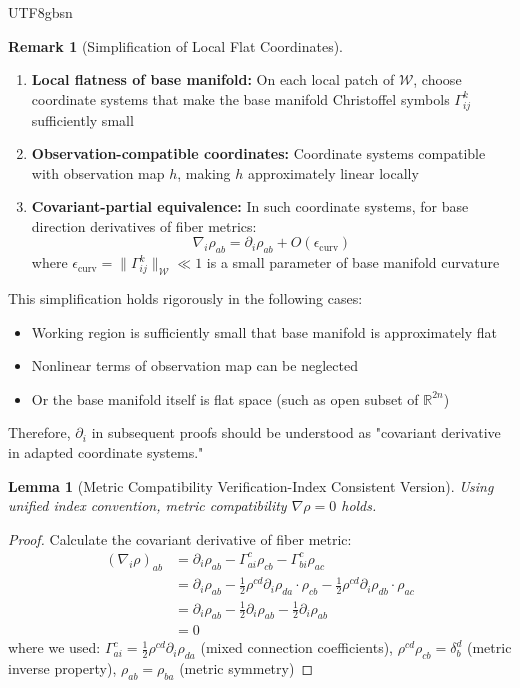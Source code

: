 \documentclass[a4paper,12pt]{extarticle}
\newtheorem{lemma}[theorem]{Lemma}
\theoremstyle{definition}
\newtheorem{remark}{Remark}
\begin{document}
\begin{CJK}{UTF8}{gbsn}
\begin{remark}[Simplification of Local Flat Coordinates]
\begin{enumerate}
\item \textbf{Local flatness of base manifold:} On each local patch of $\mathcal{W}$, choose coordinate systems that make the base manifold Christoffel symbols $\Gamma^k_{ij}$ sufficiently small
\item \textbf{Observation-compatible coordinates:} Coordinate systems compatible with observation map $h$, making $h$ approximately linear locally
\item \textbf{Covariant-partial equivalence:} In such coordinate systems, for base direction derivatives of fiber metrics:
$$\nabla_i \rho_{ab} = \partial_i \rho_{ab} + O(\epsilon_{\text{curv}})$$
where $\epsilon_{\text{curv}} = \|\Gamma^k_{ij}\|_{\mathcal{W}} \ll 1$ is a small parameter of base manifold curvature
\end{enumerate}

This simplification holds rigorously in the following cases:
\begin{itemize}
\item Working region is sufficiently small that base manifold is approximately flat
\item Nonlinear terms of observation map can be neglected
\item Or the base manifold itself is flat space (such as open subset of $\mathbb{R}^{2n}$)
\end{itemize}

Therefore, $\partial_i$ in subsequent proofs should be understood as "covariant derivative in adapted coordinate systems."
\end{remark}

\begin{lemma}[Metric Compatibility Verification-Index Consistent Version]
Using unified index convention, metric compatibility $\nabla \rho = 0$ holds.
\end{lemma}

\begin{proof}
Calculate the covariant derivative of fiber metric:
\begin{align*}
(\nabla_i \rho)_{ab} &= \partial_i \rho_{ab} - \Gamma^c_{ai} \rho_{cb} - \Gamma^c_{bi} \rho_{ac}\\
&= \partial_i \rho_{ab} - \frac{1}{2}\rho^{cd} \partial_i \rho_{da} \cdot \rho_{cb} - \frac{1}{2}\rho^{cd} \partial_i \rho_{db} \cdot \rho_{ac}\\
&= \partial_i \rho_{ab} - \frac{1}{2}\partial_i \rho_{ab} - \frac{1}{2}\partial_i \rho_{ab}\\
&= 0
\end{align*}
where we used: $\Gamma^c_{ai} = \frac{1}{2}\rho^{cd} \partial_i \rho_{da}$ (mixed connection coefficients), $\rho^{cd}\rho_{cb} = \delta^d_b$ (metric inverse property), $\rho_{ab} = \rho_{ba}$ (metric symmetry)
\end{proof}


\end{CJK}
\end{document}
